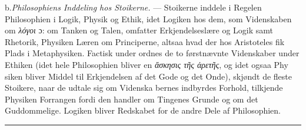\documentclass[12pt,a4paper]{book}
\newcommand{\divrule}{\begin{center}\rule{2cm}{0.4pt}\end{center}}
\newcommand{\gk}[1]{\textit{#1}}
\begin{document}
b.\enspace \emph{Philosophiens Inddeling hos Stoikerne.} --- Stoikerne
inddele i Regelen Philosophien i Logik, Physik og
Ethik, idet Logiken hos dem, som Videnskaben om \gk{λόγοι} ɔ:
om Tanken og Talen, omfatter Erkjendelseslære og Logik samt
Rhetorik, Physiken Læren om Principerne, altsaa hvad der
hos Aristoteles fik Plads i Metaphysiken. Factisk under\-%
ordnes de to førstnævnte Videnskaber under Ethiken (idet hele
Philosophien bliver en \gk{ἄσκησις τῆς ἀρετῆς}, og idet ogsaa Phy\-%
siken bliver Middel til Erkjendelsen af det Gode og det Onde),
skjøndt de fleste Stoikere, naar de udtale sig om Videnska\-%
bernes indbyrdes Forhold, tilkjende Physiken Forrangen fordi
den handler om Tingenes Grunde og om det Guddommelige.
Logiken bliver Redskabet for de andre Dele af Philosophien.
\divrule
\end{document}
